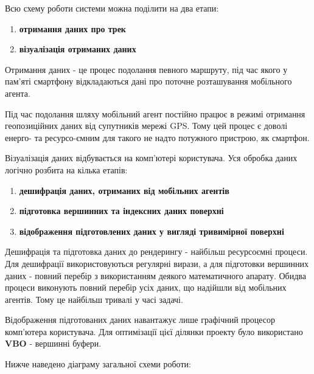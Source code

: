 \documentclass[simple,a4paper,14pt,ukrainian,utf8]{eskdtext}
\begin{document}
    Всю схему роботи системи можна поділити на два етапи:
    
    \begin{enumerate}
    	\item \textbf{отримання даних про трек}
    	\item \textbf{візуалізація отриманих даних}
    \end{enumerate}
    
    Отримання даних - це процес подолання певного маршруту, під час якого у пам’яті смартфону відкладаються дані про поточне розташування мобільного агента.
    
    Під час подолання шляху мобільний агент постійно працює в режимі отримання геопозиційних даних від супутників мережі GPS. Тому цей процес є доволі енерго- та ресурсо-ємним для такого не надто потужного пристрою, як смартфон.
    
    Візуалізація даних відбувається на комп’ютері користувача. Уся обробка даних логічно розбита на кілька етапів:
    
    \begin{enumerate}
    	\item \textbf{дешифрація даних, отриманих від мобільних агентів}
    	\item \textbf{підготовка вершинних та індексних даних поверхні}
    	\item \textbf{відображення підготовлених даних у вигляді тривимірної поверхні}
    \end{enumerate}
    
    Дешифрація та підготовка даних до рендерингу - найбільш ресурсоємні процеси. Для дешифрації використовуються регулярні вирази, а для підготовки вершинних даних - повний перебір з використанням деякого математичного апарату. Обидва процеси виконують повний перебір усіх даних, що надійшли від мобільних агентів. Тому це найбільш тривалі у часі задачі.
    
    Відображення підготованих даних навантажує лише графічний процесор комп’ютера користувача. Для оптимізації цієї ділянки проекту було використано \textbf{VBO} - вершинні буфери.

	Нижче наведено діаграму загальної схеми роботи:
	
\end{document}
